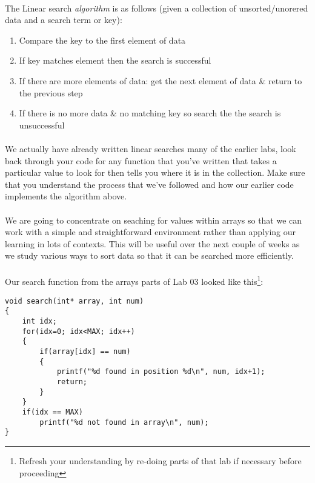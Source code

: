 \documentclass[10pt, a4paper, twosize]{article}
\begin{document}
\paragraph{} The Linear search \emph{algorithm} is as follows (given a collection of unsorted/unorered data and a search term or key):

\begin{enumerate}
\item Compare the key to the first element of data
\item If key matches element then the search is successful
\item If there are more elements of data: get the next element of data \& return to the previous step
\item If there is no more data \& no matching key so search the the search is unsuccessful
\end{enumerate}

\paragraph{} We actually have already written linear searches many of the earlier labs, look back through your code for any function that you've written that takes a particular value to look for then tells you where it is in the collection. Make sure that you understand the process that we've followed and how our earlier code implements the algorithm above.

\paragraph{} We are going to concentrate on seaching for values within arrays so that we can work with a simple and straightforward environment rather than applying our learning in lots of contexts. This will be useful over the next couple of weeks as we study various ways to sort data so that it can be searched more efficiently.

\paragraph{} Our search function from the arrays parts of Lab 03 looked like this\footnote{Refresh your understanding by re-doing parts of that lab if necessary before proceeding}:

\begin{lstlisting}
void search(int* array, int num)
{
    int idx;
    for(idx=0; idx<MAX; idx++)
    {
        if(array[idx] == num)
        {
            printf("%d found in position %d\n", num, idx+1);
            return;
        }
    }
    if(idx == MAX)
        printf("%d not found in array\n", num);
}
\end{lstlisting}
\end{document}
